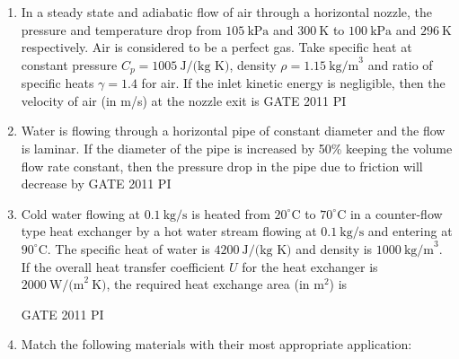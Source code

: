 \documentclass[journal,12pt,onecolumn]{IEEEtran}
\theoremstyle{remark}
\begin{document}
\begin{enumerate}
\item
In a steady state and adiabatic flow of air through a horizontal nozzle, the pressure and temperature drop from $105~\text{kPa}$ and $300~\text{K}$ to $100~\text{kPa}$ and $296~\text{K}$ respectively. Air is considered to be a perfect gas. Take specific heat at constant pressure $C_p = 1005~\text{J/(kg K)}$, density $\rho = 1.15~\text{kg/m}^3$ and ratio of specific heats $\gamma = 1.4$ for air. If the inlet kinetic energy is negligible, then the velocity of air (in m/s) at the nozzle exit is
\hfill{GATE 2011 PI}
\begin{enumerate}
\end{enumerate}

\item
Water is flowing through a horizontal pipe of constant diameter and the flow is laminar. If the diameter of the pipe is increased by 50\% keeping the volume flow rate constant, then the pressure drop in the pipe due to friction will decrease by
\hfill{GATE 2011 PI}
\begin{enumerate}
\end{enumerate}

\item
Cold water flowing at $0.1~\text{kg/s}$ is heated from $20^\circ$C to $70^\circ$C in a counter-flow type heat exchanger by a hot water stream flowing at $0.1~\text{kg/s}$ and entering at $90^\circ$C. The specific heat of water is $4200~\text{J/(kg K)}$ and density is $1000~\text{kg/m}^3$. If the overall heat transfer coefficient $U$ for the heat exchanger is $2000~\text{W/(m}^2~\text{K)}$, the required heat exchange area (in m$^2$) is

\hfill{GATE 2011 PI}
\begin{enumerate}
\end{enumerate}
\item
Match the following materials with their most appropriate application: 


\end{enumerate}
\end{document}
